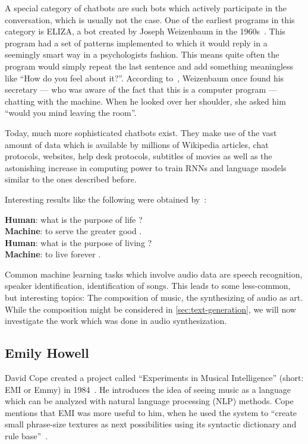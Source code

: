 \documentclass[technote,a4paper,leqno]{IEEEtran}
\begin{document}
A special category of chatbots are such bots which actively participate in the
conversation, which is usually not the case. One of the earliest programs in
this category is ELIZA, a bot created by Joseph Weizenbaum in the
1960s~\cite{Weizenbaum1976}. This program had a set of patterns implemented to
which it would reply in a seemingly smart way in a psychologists fashion. This
means quite often the program would simply repeat the last sentence and add
something meaningless like \enquote{How do you feel about it?}. According
to~\cite{Curtis2014}, Weizenbaum once found his secretary --- who was aware of
the fact that this is a computer program --- chatting with the machine. When he
looked over her shoulder, she asked him \enquote{would you mind leaving the
room}.

Today, much more sophisticated chatbots exist. They make use of the vast amount
of data which is available by millions of Wikipedia articles, chat protocols,
websites, help desk protocols, subtitles of movies as well as the astonishing
increase in computing power to train
\glspl{RNN} and language models similar to the ones described before.

Interesting results like the following were obtained
by~\cite{vinyals2015neural}:
\begin{displayquote}
\textbf{Human}: what is the purpose of life ?\\
\textbf{Machine}: to serve the greater good .\\
\textbf{Human}: what is the purpose of living ?\\
\textbf{Machine}: to live forever .
\end{displayquote}

Common machine learning tasks which involve audio data are speech recognition,
speaker identification, identification of songs. This leads to some
less-common, but interesting topics: The composition of music, the synthesizing
of audio as art. While the composition might be considered in
\cref{sec:text-generation}, we will now investigate the work which was done in
audio synthesization.

\subsection{Emily Howell}
David Cope created a project called \enquote{Experiments in Musical
Intelligence} (short: EMI or Emmy) in 1984~\cite{Cope1987}. He introduces the idea of
seeing music as a language which can be analyzed with natural language
processing (NLP) methods. Cope mentions that EMI was more useful to him, when
he used the system to \enquote{create small phrase-size textures as next
possibilities using its syntactic dictionary and rule base}~\cite{Cope1987}.
\end{document}
